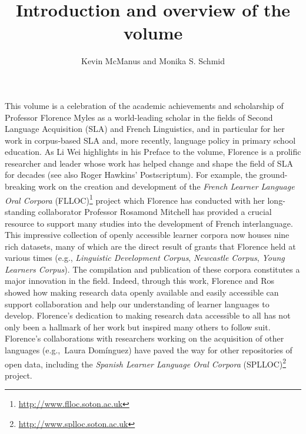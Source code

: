 \documentclass[output=paper]{langscibook}
\author{Kevin McManus\orcid{}\affiliation{Penn State University} and Monika S. Schmid\orcid{}\affiliation{University of York}}
\title{Introduction and overview of the volume}
\begin{document}
\maketitle

\noindent This volume is a celebration of the academic achievements and scholarship of Professor Florence Myles as a world-leading scholar in the fields of Second Language Acquisition (SLA) and French Linguistics, and in particular for her work in corpus-based SLA and, more recently, language policy in primary school education. As Li Wei highlights in his Preface to the volume, Florence is a prolific researcher and leader whose work has helped change and shape the field of SLA for decades (see also Roger Hawkins’ Postscriptum). For example, the ground-breaking work on the creation and development of the \textit{French Learner Language Oral Corpora} (FLLOC)\footnote{\url{http://www.flloc.soton.ac.uk}} project which Florence has conducted with her long-standing collaborator Professor Rosamond Mitchell has provided a crucial resource to support many studies into the development of French interlanguage. This impressive collection of openly accessible learner corpora now houses nine rich datasets, many of which are the direct result of grants that Florence held at various times (e.g., \textit{Linguistic Development Corpus}, \textit{Newcastle Corpus}, \textit{Young Learners Corpus}). The compilation and publication of these corpora constitutes a major innovation in the field. Indeed, through this work, Florence and Ros showed how making research data openly available and easily accessible can support collaboration and help our understanding of learner languages to develop. Florence’s dedication to making research data accessible to all has not only been a hallmark of her work but inspired many others to follow suit. Florence's collaborations with researchers working on the acquisition of other languages (e.g.,~Laura Domínguez) have paved the way for other repositories of open data, including the \textit{Spanish Learner Language Oral Corpora} (SPLLOC)\footnote{\url{http://www.splloc.soton.ac.uk}} project. 
\end{document}
